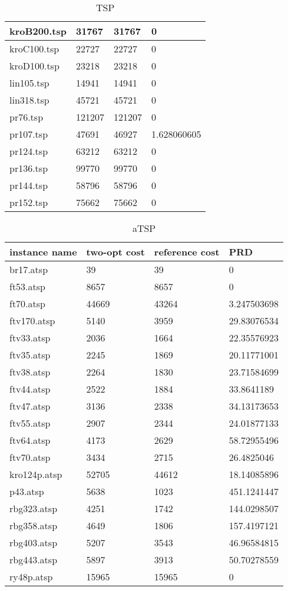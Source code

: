 \begin{table}[H]
\begin{tabular}{|l|l|l|l|}
      kroB200.tsp & 31767 & 31767 & 0 \\ \hline
      kroC100.tsp & 22727 & 22727 & 0 \\ \hline
      kroD100.tsp & 23218 & 23218 & 0 \\ \hline
      lin105.tsp & 14941 & 14941 & 0 \\ \hline
      lin318.tsp & 45721 & 45721 & 0 \\ \hline
      pr76.tsp & 121207 & 121207 & 0 \\ \hline
      pr107.tsp & 47691 & 46927 & 1.628060605 \\ \hline
      pr124.tsp & 63212 & 63212 & 0 \\ \hline
      pr136.tsp & 99770 & 99770 & 0 \\ \hline
      pr144.tsp & 58796 & 58796 & 0 \\ \hline
      pr152.tsp & 75662 & 75662 & 0 \\ \hline
  \end{tabular}
  \caption{TSP}
\end{table}

\begin{table}[H]
  \centering
  \begin{tabular}{|l|l|l|l|}
  \hline
      instance name & two-opt cost & reference cost & PRD \\ \hline \hline
      br17.atsp & 39 & 39 & 0 \\ \hline
      ft53.atsp & 8657 & 8657 & 0 \\ \hline
      ft70.atsp & 44669 & 43264 & 3.247503698 \\ \hline
      ftv170.atsp & 5140 & 3959 & 29.83076534 \\ \hline
      ftv33.atsp & 2036 & 1664 & 22.35576923 \\ \hline
      ftv35.atsp & 2245 & 1869 & 20.11771001 \\ \hline
      ftv38.atsp & 2264 & 1830 & 23.71584699 \\ \hline
      ftv44.atsp & 2522 & 1884 & 33.8641189 \\ \hline
      ftv47.atsp & 3136 & 2338 & 34.13173653 \\ \hline
      ftv55.atsp & 2907 & 2344 & 24.01877133 \\ \hline
      ftv64.atsp & 4173 & 2629 & 58.72955496 \\ \hline
      ftv70.atsp & 3434 & 2715 & 26.4825046 \\ \hline
      kro124p.atsp & 52705 & 44612 & 18.14085896 \\ \hline
      p43.atsp & 5638 & 1023 & 451.1241447 \\ \hline
      rbg323.atsp & 4251 & 1742 & 144.0298507 \\ \hline
      rbg358.atsp & 4649 & 1806 & 157.4197121 \\ \hline
      rbg403.atsp & 5207 & 3543 & 46.96584815 \\ \hline
      rbg443.atsp & 5897 & 3913 & 50.70278559 \\ \hline
      ry48p.atsp & 15965 & 15965 & 0 \\ \hline
  \end{tabular}
  \caption{aTSP}
\end{table}

